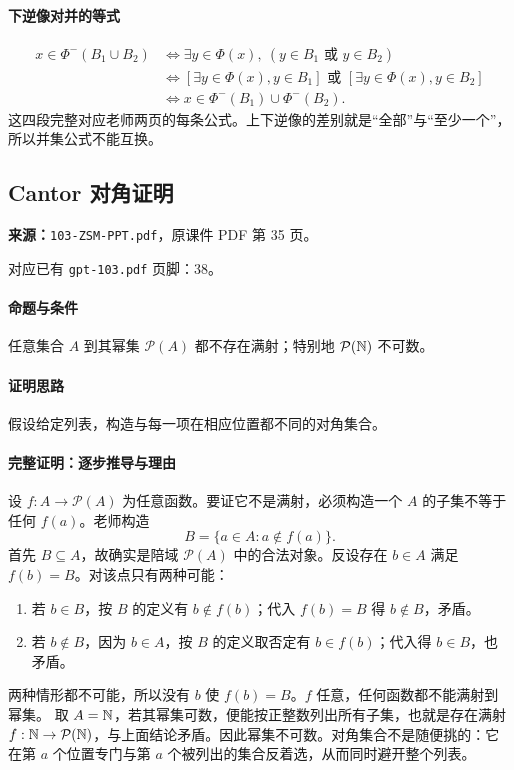 \paragraph{下逆像对并的等式}
\begin{align*}
x\in\Phi^-(B_1\cup B_2)
&\iff\exists y\in\Phi(x),\ (y\in B_1\text{ 或 }y\in B_2)\\
&\iff[\exists y\in\Phi(x),y\in B_1]\text{ 或 }[\exists y\in\Phi(x),y\in B_2]\\
&\iff x\in\Phi^-(B_1)\cup\Phi^-(B_2).
\end{align*}
这四段完整对应老师两页的每条公式。上下逆像的差别就是“全部”与“至少一个”，所以并集公式不能互换。

\clearpage\subsection{Cantor 对角证明}
\textbf{来源：}\texttt{103-ZSM-PPT.pdf}，原课件 PDF 第 35 页。\par
对应已有 \texttt{gpt-103.pdf} 页脚：38。\par
\paragraph{命题与条件}任意集合 $A$ 到其幂集 $\mathcal P(A)$ 都不存在满射；特别地 $\mathcal P(\mathbb{N})$ 不可数。
\paragraph{证明思路}假设给定列表，构造与每一项在相应位置都不同的对角集合。
\paragraph{完整证明：逐步推导与理由}

设 $f:A\to\mathcal P(A)$ 为任意函数。要证它不是满射，必须构造一个 $A$ 的子集不等于任何 $f(a)$。老师构造
\[B=\{a\in A:a\notin f(a)\}.\]
首先 $B\subseteq A$，故确实是陪域 $\mathcal P(A)$ 中的合法对象。反设存在 $b\in A$ 满足 $f(b)=B$。对该点只有两种可能：
\begin{enumerate}
\item 若 $b\in B$，按 $B$ 的定义有 $b\notin f(b)$；代入 $f(b)=B$ 得 $b\notin B$，矛盾。
\item 若 $b\notin B$，因为 $b\in A$，按 $B$ 的定义取否定有 $b\in f(b)$；代入得 $b\in B$，也矛盾。
\end{enumerate}
两种情形都不可能，所以没有 $b$ 使 $f(b)=B$。$f$ 任意，任何函数都不能满射到幂集。
取 $A=\mathbb{N}$，若其幂集可数，便能按正整数列出所有子集，也就是存在满射 $f:\mathbb{N}\to\mathcal P(\mathbb{N})$，与上面结论矛盾。因此幂集不可数。对角集合不是随便挑的：它在第 $a$ 个位置专门与第 $a$ 个被列出的集合反着选，从而同时避开整个列表。

